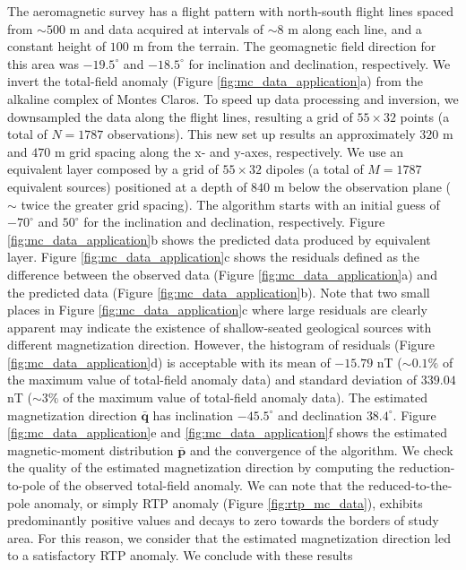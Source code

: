 The aeromagnetic survey has a flight pattern with north-south flight lines spaced from 
$\sim 500$ m and data acquired at intervals of $ \sim 8$ m along each line, and a constant 
height of $100$ m from the terrain. The geomagnetic field direction for this area was 
$-19.5^\circ$ and $-18.5^\circ$ for inclination and declination, respectively. 
We invert the total-field anomaly (Figure \ref{fig:mc_data_application}a) from the alkaline 
complex of Montes Claros. To speed up data processing and inversion, we downsampled the 
data along the flight lines, resulting a grid of $55 \times 32$ points (a total of 
$N=1787$ observations). This new set up results an approximately $320$ m and $470$ m 
grid spacing along the x- and y-axes, respectively. We use an equivalent layer composed by 
a grid of $55 \times 32$ dipoles (a total of $M=1787$ equivalent sources) positioned at a 
depth of $840$ m below the observation plane ($\sim$ twice the greater grid spacing). 
The algorithm starts with an initial guess of $-70^\circ$ and $50^\circ$ for the inclination 
and declination, respectively. Figure \ref{fig:mc_data_application}b shows the predicted data 
produced by equivalent layer. Figure \ref{fig:mc_data_application}c shows the residuals defined 
as the difference between the observed data (Figure \ref{fig:mc_data_application}a) and the 
predicted data (Figure \ref{fig:mc_data_application}b). Note that two small places in 
Figure \ref{fig:mc_data_application}c where large residuals are clearly apparent may indicate 
the existence of shallow-seated geological sources with different magnetization direction. 
However, the histogram of residuals (Figure \ref{fig:mc_data_application}d) is acceptable with 
its mean of $-15.79$ nT ($\sim 0.1\% $ of the maximum value of total-field anomaly data) and 
standard deviation of $339.04$ nT ($\sim 3 \% $ of the maximum value of total-field anomaly 
data). The estimated magnetization direction $\bar{\mathbf{q}}$ has inclination $-45.5^\circ$ 
and declination $38.4^\circ$. Figure \ref{fig:mc_data_application}e and 
\ref{fig:mc_data_application}f shows the estimated magnetic-moment distribution 
$\bar{\mathbf{p}}$ and the convergence of the algorithm. We check the quality of the 
estimated magnetization direction by computing the reduction-to-pole of the observed 
total-field anomaly. We can note that the reduced-to-the-pole anomaly, or simply RTP anomaly 
(Figure \ref{fig:rtp_mc_data}), exhibits predominantly positive values and decays to zero 
towards the borders of study area. For this reason, we consider that the estimated 
magnetization direction led to a satisfactory RTP anomaly. We conclude with these results 
